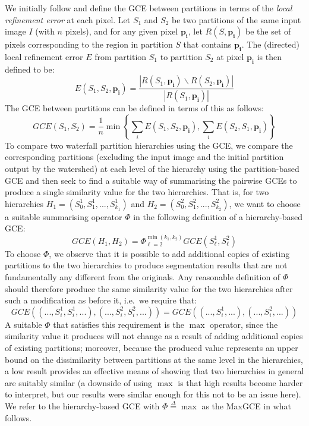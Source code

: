 \documentclass[preprint,a4paper]{elsarticle}
\newcommand{\eqdef}{\stackrel{\Delta}{=}}
\begin{document}
We initially follow \cite{martin01} and define the GCE between partitions in terms of the \emph{local refinement error} at each pixel. Let $S_1$ and $S_2$ be two partitions of the same input image $I$ (with $n$ pixels), and for any given pixel $\mathbf{p_i}$, let $R(S,\mathbf{p_i})$ be the set of pixels corresponding to the region in partition $S$ that contains $\mathbf{p_i}$. The (directed) local refinement error $E$ from partition $S_1$ to partition $S_2$ at pixel $\mathbf{p_i}$ is then defined to be:
%
\[
E(S_1,S_2,\mathbf{p_i}) = \frac{|R(S_1,\mathbf{p_i}) \backslash R(S_2,\mathbf{p_i})|}{|R(S_1,\mathbf{p_i})|}
\]
%
The GCE between partitions can be defined in terms of this as follows:
%
\[
GCE(S_1,S_2) = \frac{1}{n} \min \left\{ \sum_i E(S_1,S_2,\mathbf{p_i}), \sum_i E(S_2,S_1,\mathbf{p_i}) \right\}
\]
%
To compare two waterfall partition hierarchies using the GCE, we compare the corresponding partitions (excluding the input image and the initial partition output by the watershed) at each level of the hierarchy using the partition-based GCE and then seek to find a suitable way of summarising the pairwise GCEs to produce a single similarity value for the two hierarchies. That is, for two hierarchies $H_1 = (S_0^1,S_1^1,...,S_{k_1}^1)$ and $H_2 = (S_0^2,S_1^2,...,S_{k_2}^2)$, we want to choose a suitable summarising operator $\Phi$ in the following definition of a hierarchy-based GCE:
%
\[
GCE(H_1,H_2) = \Phi_{\ell=2}^{\min(k_1,k_2)} GCE(S_\ell^1,S_\ell^2)
\]
%
To choose $\Phi$, we observe that it is possible to add additional copies of existing partitions to the two hierarchies to produce segmentation results that are not fundamentally any different from the originals. Any reasonable definition of $\Phi$ should therefore produce the same similarity value for the two hierarchies after such a modification as before it, i.e.~we require that:
%
\[
GCE((...,S_i^1,S_i^1,...),(...,S_i^2,S_i^2,...)) = GCE((...,S_i^1,...),(...,S_i^2,...))
\]
%
A suitable $\Phi$ that satisfies this requirement is the $\max$ operator, since the similarity value it produces will not change as a result of adding additional copies of existing partitions; moreover, because the produced value represents an upper bound on the dissimilarity between partitions at the same level in the hierarchies, a low result provides an effective means of showing that two hierarchies in general are suitably similar (a downside of using $\max$ is that high results become harder to interpret, but our results were similar enough for this not to be an issue here). We refer to the hierarchy-based GCE with $\Phi \eqdef \max$ as the MaxGCE in what follows.
\end{document}
